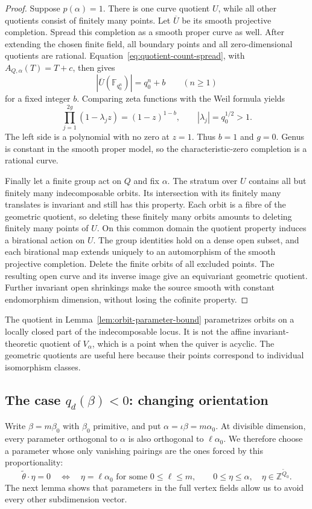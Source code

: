 \documentclass[11pt, reqno]{amsart}
\numberwithin{equation}{section}
\theoremstyle{definition}
\theoremstyle{remark}
\newcommand{\mb}[1]{\mathbb{#1}}
\newcommand{\Qbar}{\widetilde Q}
\begin{document}
\begin{proof}
Suppose $p(\alpha)=1$. There is one curve quotient $U$, while all
other quotients consist of finitely many points. Let $\overline U$ be
its smooth projective completion. Spread this completion as a smooth
proper curve as well. After extending the chosen finite field, all
boundary points and all zero-dimensional quotients are rational.
Equation~\eqref{eq:quotient-count-spread}, with $A_{Q,\alpha}(T)=T+c$,
then gives
\[ |\overline U(\mb F_{q_0^n})|=q_0^n+b\qquad(n\ge1) \]
for a fixed integer $b$. Comparing zeta functions with the Weil formula
\cite[Sections~14 and 26--27]{MilneEtale} yields
\[ \prod_{j=1}^{2g}(1-\lambda_j z)=(1-z)^{1-b},\qquad |\lambda_j|=q_0^{1/2}>1. \]
The left side is a polynomial with no zero at $z=1$. Thus $b=1$ and
$g=0$. Genus is constant in the smooth proper model, so the
characteristic-zero completion is a rational curve.

Finally let a finite group act on $Q$ and fix $\alpha$. The stratum
over $U$ contains all but finitely many indecomposable orbits. Its
intersection with its finitely many translates is invariant and still
has this property. Each orbit is a fibre of the geometric quotient,
so deleting these finitely many orbits amounts to deleting finitely
many points of $U$. On this common domain the quotient property
induces a birational action on $U$. The group identities hold on a
dense open subset, and each birational map extends uniquely to an
automorphism of the smooth projective completion. Delete the finite
orbits of all excluded points. The resulting open curve and its
inverse image give an equivariant geometric quotient. Further
invariant open shrinkings make the source smooth with constant
endomorphism dimension, without losing the cofinite property.
\end{proof}

The quotient in Lemma~\ref{lem:orbit-parameter-bound} parametrizes
orbits on a locally closed part of the indecomposable locus. It is not
the affine invariant-theoretic quotient of $V_\alpha$, which is a point
when the quiver is acyclic. The geometric quotients are useful here
because their points correspond to individual isomorphism classes.

\subsection{The case $q_d(\beta)<0$: changing orientation}

Write $\beta=m\beta_0$ with $\beta_0$ primitive, and put
$\alpha=\iota\beta=m\alpha_0$. At divisible dimension, every parameter
orthogonal to $\alpha$ is also orthogonal to $\ell\alpha_0$.
We therefore choose a parameter whose only vanishing pairings are the
ones forced by this proportionality:
\begin{equation}\label{eq:proportional-parameter} \widetilde\theta\cdot\eta=0 \quad\Longleftrightarrow\quad \eta=\ell\alpha_0\text{ for some }0\le\ell\le m, \qquad 0\le\eta\le\alpha,\quad \eta\in\mb Z^{\Qbar_0}.\end{equation}
The next lemma shows that parameters in the full vertex fields allow
us to avoid every other subdimension vector.
\end{document}

